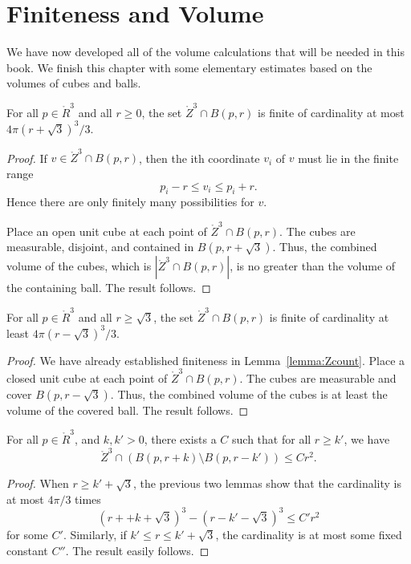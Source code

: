 \section{Finiteness and Volume}

We have now developed all of the volume calculations that will
be needed in this book.   We finish this chapter with some 
elementary estimates based on the volumes of  cubes and balls.

\begin{lemma}
    For all $p\in\ring{R}^3$ and all $r\ge 0$, the set
    $\ring{Z}^3\cap B(p,r)$ is finite of cardinality at most
    $4\pi (r+\sqrt3)^3/3$.
\end{lemma}

\begin{proof}  If $v\in\ring{Z}^3\cap B(p,r)$, then the ith
coordinate $v_i$ of $v$ must lie in the finite range
    $$
    p_i - r \le v_i \le p_i + r.
    $$
Hence there are only finitely many possibilities for $v$.


Place an open unit cube at each point of $\ring{Z}^3\cap B(p,r)$.
The cubes are measurable, disjoint, and contained in
$B(p,r+\sqrt3)$.  Thus, the combined volume of the cubes, which is
$|\ring{Z}^3\cap B(p,r)|$,  is no greater than the volume of the
containing ball.  The result follows.
\end{proof}

\begin{lemma}
  For all $p\in\ring{R}^3$ and all $r\ge\sqrt3$, the set
    $\ring{Z}^3\cap B(p,r)$ is finite of cardinality at least
    $4\pi (r-\sqrt3)^3/3$.
\end{lemma}

\begin{proof} We have already established finiteness in
Lemma~\ref{lemma:Zcount}.  Place a closed unit cube at each point
of $\ring{Z}^3\cap B(p,r)$.  The cubes are measurable and cover
$B(p,r-\sqrt3)$.  Thus, the combined volume of the cubes is at
least the volume of the covered ball.  The result follows.
\end{proof}

\begin{lemma}
For all $p\in\ring{R}^3$, and $k,k'>0$, there exists a $C$ such
that for all $r\ge k'$, we have
    $$
    \ring{Z}^3 \cap (B(p,r+k) \setminus B(p,r-k')) \le C r^2.
    $$
\end{lemma}

\begin{proof}  When $r \ge k'+\sqrt3$, the previous two lemmas show
that the cardinality is at most $4\pi/3$ times
    $$(r + +k + \sqrt3)^3 - (r - k' - \sqrt3)^3 \le C' r^2$$
for some $C'$.  Similarly, if $k'\le r\le k'+\sqrt3$, the
cardinality is at most some fixed constant $C''$.  The result
easily follows.
\end{proof}

